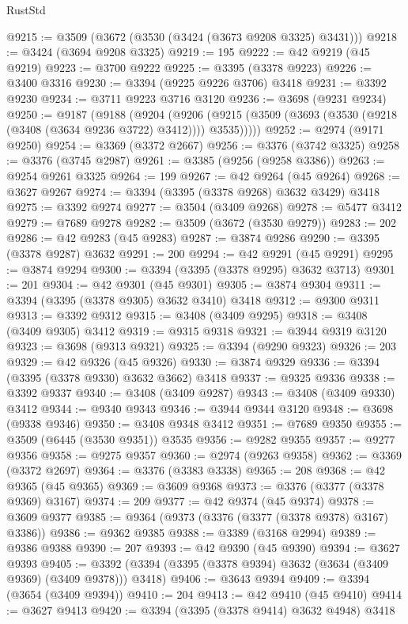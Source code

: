 \begin{lexlean}{RustStd}
\begin{coremodule}
@9215 := @3509 (@3672 (@3530 (@3424 (@3673 @9208 @3325) @3431)))
@9218 := @3424 (@3694 @9208 @3325)
@9219 := 195
@9222 := @42 @9219 (@45 @9219)
@9223 := @3700 @9222
@9225 := @3395 (@3378 @9223)
@9226 := @3400 @3316
@9230 := @3394 (@9225 @9226 @3706) @3418
@9231 := @3392 @9230
@9234 := @3711 @9223 @3716 @3120
@9236 := @3698 (@9231 @9234)
@9250 := @9187
    (@9188
      (@9204
        (@9206 (@9215 (@3509 (@3693 (@3530 (@9218 (@3408 (@3634 @9236 @3722) @3412)))) @3535)))))
@9252 := @2974 (@9171 @9250)
@9254 := @3369 (@3372 @2667)
@9256 := @3376 (@3742 @3325)
@9258 := @3376 (@3745 @2987)
@9261 := @3385 (@9256 (@9258 @3386))
@9263 := @9254 @9261 @3325
@9264 := 199
@9267 := @42 @9264 (@45 @9264)
@9268 := @3627 @9267
@9274 := @3394 (@3395 (@3378 @9268) @3632 @3429) @3418
@9275 := @3392 @9274
@9277 := @3504 (@3409 @9268)
@9278 := @5477 @3412
@9279 := @7689 @9278
@9282 := @3509 (@3672 (@3530 @9279))
@9283 := 202
@9286 := @42 @9283 (@45 @9283)
@9287 := @3874 @9286
@9290 := @3395 (@3378 @9287) @3632
@9291 := 200
@9294 := @42 @9291 (@45 @9291)
@9295 := @3874 @9294
@9300 := @3394 (@3395 (@3378 @9295) @3632 @3713)
@9301 := 201
@9304 := @42 @9301 (@45 @9301)
@9305 := @3874 @9304
@9311 := @3394 (@3395 (@3378 @9305) @3632 @3410) @3418
@9312 := @9300 @9311
@9313 := @3392 @9312
@9315 := @3408 (@3409 @9295)
@9318 := @3408 (@3409 @9305) @3412
@9319 := @9315 @9318
@9321 := @3944 @9319 @3120
@9323 := @3698 (@9313 @9321)
@9325 := @3394 (@9290 @9323)
@9326 := 203
@9329 := @42 @9326 (@45 @9326)
@9330 := @3874 @9329
@9336 := @3394 (@3395 (@3378 @9330) @3632 @3662) @3418
@9337 := @9325 @9336
@9338 := @3392 @9337
@9340 := @3408 (@3409 @9287)
@9343 := @3408 (@3409 @9330) @3412
@9344 := @9340 @9343
@9346 := @3944 @9344 @3120
@9348 := @3698 (@9338 @9346)
@9350 := @3408 @9348 @3412
@9351 := @7689 @9350
@9355 := @3509 (@6445 (@3530 @9351)) @3535
@9356 := @9282 @9355
@9357 := @9277 @9356
@9358 := @9275 @9357
@9360 := @2974 (@9263 @9358)
@9362 := @3369 (@3372 @2697)
@9364 := @3376 (@3383 @3338)
@9365 := 208
@9368 := @42 @9365 (@45 @9365)
@9369 := @3609 @9368
@9373 := @3376 (@3377 (@3378 @9369) @3167)
@9374 := 209
@9377 := @42 @9374 (@45 @9374)
@9378 := @3609 @9377
@9385 := @9364 (@9373 (@3376 (@3377 (@3378 @9378) @3167) @3386))
@9386 := @9362 @9385
@9388 := @3389 (@3168 @2994)
@9389 := @9386 @9388
@9390 := 207
@9393 := @42 @9390 (@45 @9390)
@9394 := @3627 @9393
@9405 := @3392 (@3394 (@3395 (@3378 @9394) @3632 (@3634 (@3409 @9369) (@3409 @9378))) @3418)
@9406 := @3643 @9394
@9409 := @3394 (@3654 (@3409 @9394))
@9410 := 204
@9413 := @42 @9410 (@45 @9410)
@9414 := @3627 @9413
@9420 := @3394 (@3395 (@3378 @9414) @3632 @4948) @3418

\end{coremodule}
\end{lexlean}
